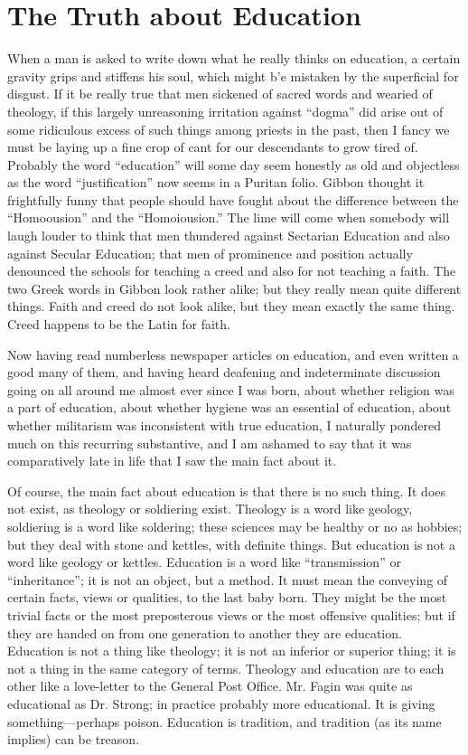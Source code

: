 \documentclass{book}
\begin{document}
\chapter{The Truth about Education}
\label{chapter-35}
When a man is asked to write down what he really thinks on education, a certain gravity grips and stiffens his soul, which might b’e mistaken by the superficial for disgust. If it be really true that men sickened of sacred words and wearied of theology, if this largely unreasoning irritation against “dogma” did arise out of some ridiculous excess of such things among priests in the past, then I fancy we must be laying up a fine crop of cant for our descendants to grow tired of. Probably the word “education” will some day seem honestly as old and objectless as the word “justification” now seems in a Puritan folio. Gibbon thought it frightfully funny that people should have fought about the difference between the “Homoousion” and the “Homoiousion.” The lime will come when somebody will laugh louder to think that men thundered against Sectarian Education and also against Secular Education; that men of prominence and position actually denounced the schools for teaching a creed and also for not teaching a faith. The two Greek words in Gibbon look rather alike; but they really mean quite different things. Faith and creed do not look alike, but they mean exactly the same thing. Creed happens to be the Latin for faith.

Now having read numberless newspaper articles on education, and even written a good many of them, and having heard deafening and indeterminate discussion going on all around me almost ever since I was born, about whether religion was a part of education, about whether hygiene was an essential of education, about whether militarism was inconsistent with true education, I naturally pondered much on this recurring substantive, and I am ashamed to say that it was comparatively late in life that I saw the main fact about it.

Of course, the main fact about education is that there is no such thing. It does not exist, as theology or soldiering exist. Theology is a word like geology, soldiering is a word like soldering; these sciences may be healthy or no as hobbies; but they deal with stone and kettles, with definite things. But education is not a word like geology or kettles. Education is a word like “transmission” or “inheritance”; it is not an object, but a method. It must mean the conveying of certain facts, views or qualities, to the last baby born. They might be the most trivial facts or the most preposterous views or the most offensive qualities; but if they are handed on from one generation to another they are education. Education is not a thing like theology; it is not an inferior or superior thing; it is not a thing in the same category of terms. Theology and education are to each other like a love-letter to the General Post Office. Mr. Fagin was quite as educational as Dr. Strong; in practice probably more educational. It is giving something—perhaps poison. Education is tradition, and tradition (as its name implies) can be treason.
\end{document}
